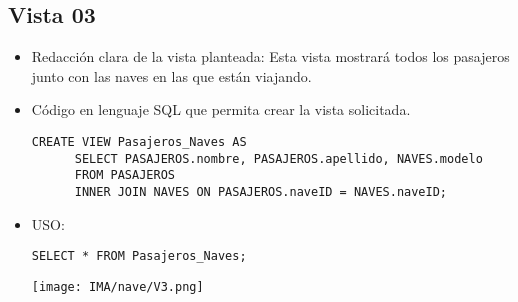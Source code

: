 \subsection*{Vista 03}

\begin{itemize}
    \item Redacción clara de la vista planteada: Esta vista mostrará todos los pasajeros junto con las naves en las que están viajando.
    \item Código en lenguaje SQL que permita crear la vista solicitada.
    
    \begin{lstlisting}[caption={Tablas para la BdDatos}, label={lst:sql_estadios}]
      CREATE VIEW Pasajeros_Naves AS
      SELECT PASAJEROS.nombre, PASAJEROS.apellido, NAVES.modelo
      FROM PASAJEROS
      INNER JOIN NAVES ON PASAJEROS.naveID = NAVES.naveID;      
    \end{lstlisting}    
    
    \item USO:
    
    \begin{lstlisting}[caption={Tablas para la BdDatos}, label={lst:sql_estadios}]
      SELECT * FROM Pasajeros_Naves;
    \end{lstlisting}    

    \begin{center}
      \texttt{[image: IMA/nave/V3.png]}
    \end{center}
\end{itemize}
